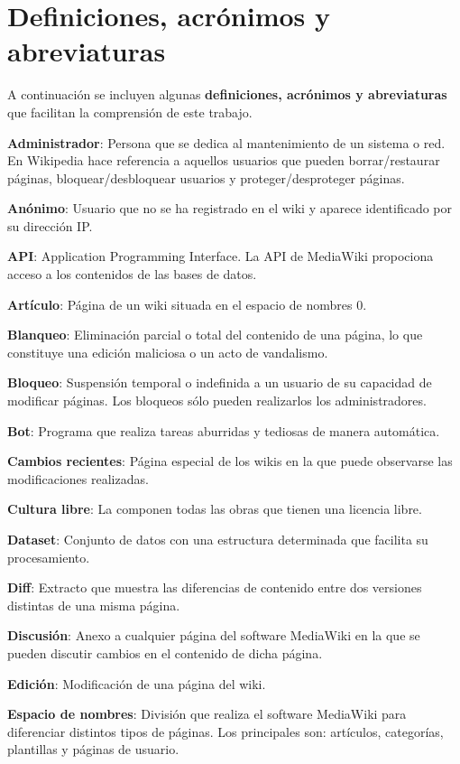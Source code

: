 \documentclass[11pt,onecolumn]{article}
\begin{document}
\section{Definiciones, acrónimos y abreviaturas}


A continuación se incluyen algunas \textbf{definiciones, acrónimos y abreviaturas} que facilitan la comprensión de este trabajo.

\textbf{Administrador}: Persona que se dedica al mantenimiento de un sistema o red. En Wikipedia hace referencia a aquellos usuarios que pueden borrar/restaurar páginas, bloquear/desbloquear usuarios y proteger/desproteger páginas.

\textbf{Anónimo}: Usuario que no se ha registrado en el wiki y aparece identificado por su dirección IP.

\textbf{API}: Application Programming Interface. La API de MediaWiki propociona acceso a los contenidos de las bases de datos.

\textbf{Artículo}: Página de un wiki situada en el espacio de nombres 0.

\textbf{Blanqueo}: Eliminación parcial o total del contenido de una página, lo que constituye una edición maliciosa o un acto de vandalismo.

\textbf{Bloqueo}: Suspensión temporal o indefinida a un usuario de su capacidad de modificar páginas. Los bloqueos sólo pueden realizarlos los administradores.

\textbf{Bot}: Programa que realiza tareas aburridas y tediosas de manera automática.

\textbf{Cambios recientes}: Página especial de los wikis en la que puede observarse las modificaciones realizadas.

\textbf{Cultura libre}: La componen todas las obras que tienen una licencia libre.

\textbf{Dataset}: Conjunto de datos con una estructura determinada que facilita su procesamiento.

\textbf{Diff}: Extracto que muestra las diferencias de contenido entre dos versiones distintas de una misma página.

\textbf{Discusión}: Anexo a cualquier página del software MediaWiki en la que se pueden discutir cambios en el contenido de dicha página.

\textbf{Edición}: Modificación de una página del wiki.

\textbf{Espacio de nombres}: División que realiza el software MediaWiki para diferenciar distintos tipos de páginas. Los principales son: artículos, categorías, plantillas y páginas de usuario.
\end{document}
